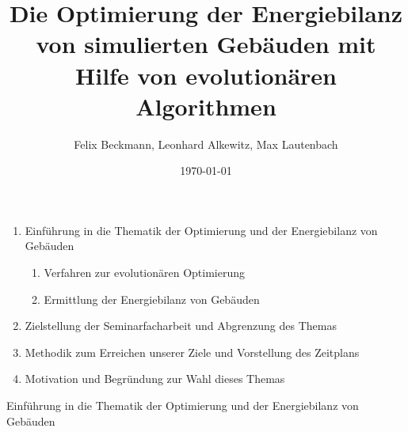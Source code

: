 \documentclass[11pt]{beamer}
\author{Felix Beckmann, Leonhard Alkewitz, Max Lautenbach}
\title{Die Optimierung der Energiebilanz von simulierten Gebäuden mit Hilfe von evolutionären Algorithmen}
\institute{Spezialschulteil des Albert-Schweizer Gymnasium Erfurt}
\date{\today}
\begin{document}
\begin{frame}
\titlepage
\end{frame}

\begin{frame}
\begin{enumerate}
\item{Einführung in die Thematik der Optimierung und der Energiebilanz von Gebäuden}
\begin{enumerate}
\item{Verfahren zur evolutionären Optimierung}
\item{Ermittlung der Energiebilanz von Gebäuden}
\end{enumerate}
\item{Zielstellung der Seminarfacharbeit und Abgrenzung des Themas}
\item{Methodik zum Erreichen unserer Ziele und Vorstellung des Zeitplans}
\item{Motivation und Begründung zur Wahl dieses Themas}
\end{enumerate}
\end{frame}

\begin{frame}{Einführung in die Thematik der Optimierung und der Energiebilanz von Gebäuden}

\end{frame}
\end{document}
